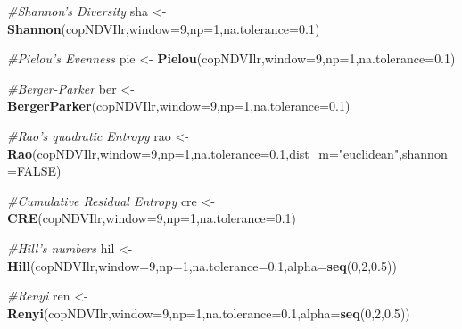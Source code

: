 \documentclass[
]{article}
\newenvironment{Shaded}{\begin{snugshade}}{\end{snugshade}}
\newcommand{\CommentTok}[1]{\textcolor[rgb]{0.56,0.35,0.01}{\textit{#1}}}
\newcommand{\DataTypeTok}[1]{\textcolor[rgb]{0.13,0.29,0.53}{#1}}
\newcommand{\DecValTok}[1]{\textcolor[rgb]{0.00,0.00,0.81}{#1}}
\newcommand{\FloatTok}[1]{\textcolor[rgb]{0.00,0.00,0.81}{#1}}
\newcommand{\KeywordTok}[1]{\textcolor[rgb]{0.13,0.29,0.53}{\textbf{#1}}}
\newcommand{\NormalTok}[1]{#1}
\newcommand{\OtherTok}[1]{\textcolor[rgb]{0.56,0.35,0.01}{#1}}
\newcommand{\StringTok}[1]{\textcolor[rgb]{0.31,0.60,0.02}{#1}}
\begin{document}
\begin{Shaded}
\begin{Highlighting}[]
\CommentTok{#Shannon's Diversity}
\NormalTok{sha <-}\StringTok{ }\KeywordTok{Shannon}\NormalTok{(copNDVIlr,}\DataTypeTok{window=}\DecValTok{9}\NormalTok{,}\DataTypeTok{np=}\DecValTok{1}\NormalTok{,}\DataTypeTok{na.tolerance=}\FloatTok{0.1}\NormalTok{)}

\CommentTok{#Pielou's Evenness}
\NormalTok{pie <-}\StringTok{ }\KeywordTok{Pielou}\NormalTok{(copNDVIlr,}\DataTypeTok{window=}\DecValTok{9}\NormalTok{,}\DataTypeTok{np=}\DecValTok{1}\NormalTok{,}\DataTypeTok{na.tolerance=}\FloatTok{0.1}\NormalTok{)}

\CommentTok{#Berger-Parker}
\NormalTok{ber <-}\StringTok{ }\KeywordTok{BergerParker}\NormalTok{(copNDVIlr,}\DataTypeTok{window=}\DecValTok{9}\NormalTok{,}\DataTypeTok{np=}\DecValTok{1}\NormalTok{,}\DataTypeTok{na.tolerance=}\FloatTok{0.1}\NormalTok{)}

\CommentTok{#Rao's quadratic Entropy}
\NormalTok{rao <-}\StringTok{ }\KeywordTok{Rao}\NormalTok{(copNDVIlr,}\DataTypeTok{window=}\DecValTok{9}\NormalTok{,}\DataTypeTok{np=}\DecValTok{1}\NormalTok{,}\DataTypeTok{na.tolerance=}\FloatTok{0.1}\NormalTok{,}\DataTypeTok{dist_m=}\StringTok{"euclidean"}\NormalTok{,}\DataTypeTok{shannon=}\OtherTok{FALSE}\NormalTok{)}

\CommentTok{#Cumulative Residual Entropy}
\NormalTok{cre <-}\StringTok{ }\KeywordTok{CRE}\NormalTok{(copNDVIlr,}\DataTypeTok{window=}\DecValTok{9}\NormalTok{,}\DataTypeTok{np=}\DecValTok{1}\NormalTok{,}\DataTypeTok{na.tolerance=}\FloatTok{0.1}\NormalTok{)}

\CommentTok{#Hill's numbers}
\NormalTok{hil <-}\StringTok{ }\KeywordTok{Hill}\NormalTok{(copNDVIlr,}\DataTypeTok{window=}\DecValTok{9}\NormalTok{,}\DataTypeTok{np=}\DecValTok{1}\NormalTok{,}\DataTypeTok{na.tolerance=}\FloatTok{0.1}\NormalTok{,}\DataTypeTok{alpha=}\KeywordTok{seq}\NormalTok{(}\DecValTok{0}\NormalTok{,}\DecValTok{2}\NormalTok{,}\FloatTok{0.5}\NormalTok{))}

\CommentTok{#Renyi}
\NormalTok{ren <-}\StringTok{ }\KeywordTok{Renyi}\NormalTok{(copNDVIlr,}\DataTypeTok{window=}\DecValTok{9}\NormalTok{,}\DataTypeTok{np=}\DecValTok{1}\NormalTok{,}\DataTypeTok{na.tolerance=}\FloatTok{0.1}\NormalTok{,}\DataTypeTok{alpha=}\KeywordTok{seq}\NormalTok{(}\DecValTok{0}\NormalTok{,}\DecValTok{2}\NormalTok{,}\FloatTok{0.5}\NormalTok{))}
\end{Highlighting}
\end{Shaded}
\end{document}
